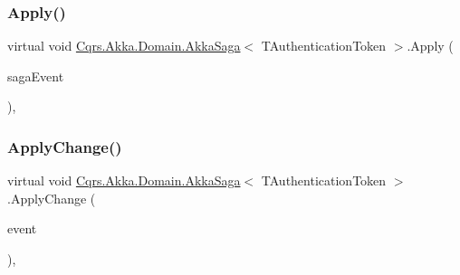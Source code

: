 \subsubsection{\texorpdfstring{Apply()}{Apply()}}
{\footnotesize\ttfamily virtual void \hyperlink{classCqrs_1_1Akka_1_1Domain_1_1AkkaSaga}{Cqrs.\+Akka.\+Domain.\+Akka\+Saga}$<$ T\+Authentication\+Token $>$.Apply (\begin{DoxyParamCaption}\item[{\hyperlink{interfaceCqrs_1_1Events_1_1ISagaEvent}{I\+Saga\+Event}$<$ T\+Authentication\+Token $>$}]{saga\+Event }\end{DoxyParamCaption})\hspace{0.3cm}{\ttfamily [protected]}, {\ttfamily [virtual]}}

\mbox{\label{classCqrs_1_1Akka_1_1Domain_1_1AkkaSaga_a42126a6a1a7896d16412b6023f208f7c_a42126a6a1a7896d16412b6023f208f7c}} 
\subsubsection{\texorpdfstring{Apply\+Change()}{ApplyChange()}\hspace{0.1cm}{\footnotesize\ttfamily [1/2]}}
{\footnotesize\ttfamily virtual void \hyperlink{classCqrs_1_1Akka_1_1Domain_1_1AkkaSaga}{Cqrs.\+Akka.\+Domain.\+Akka\+Saga}$<$ T\+Authentication\+Token $>$.Apply\+Change (\begin{DoxyParamCaption}\item[{\hyperlink{interfaceCqrs_1_1Events_1_1ISagaEvent}{I\+Saga\+Event}$<$ T\+Authentication\+Token $>$ @}]{event }\end{DoxyParamCaption})\hspace{0.3cm}{\ttfamily [protected]}, {\ttfamily [virtual]}}

\mbox{\label{classCqrs_1_1Akka_1_1Domain_1_1AkkaSaga_a18d554cd5ad329ab152efb7d852f2438_a18d554cd5ad329ab152efb7d852f2438}} 
